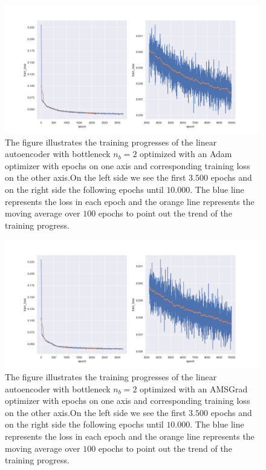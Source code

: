 \begin{figure}
\begin{center}
\includegraphics[width=\linewidth]{linear_AE_2d_adam_training_progress}
\end{center}
\caption{The figure illustrates the training progresses of the linear autoencoder with bottleneck $n_b=2$ optimized with an Adam optimizer with epochs on one axis and corresponding training loss on the other axis.On the left side we see the first $3.500$ epochs and on the right side the following epochs until $10.000$. The blue line represents the loss in each epoch and the orange line represents the moving average over $100$ epochs to point out the trend of the training progress.}\label{fig:linear_AE_2d_adam_training_progress}
\end{figure}


\begin{figure}
\begin{center}
\includegraphics[width=\linewidth]{linear_AE_2d_amsgrad_training_progress}
\end{center}
\caption{The figure illustrates the training progresses of the linear autoencoder with bottleneck $n_b=2$ optimized with an AMSGrad optimizer with epochs on one axis and corresponding training loss on the other axis.On the left side we see the first $3.500$ epochs and on the right side the following epochs until $10.000$. The blue line represents the loss in each epoch and the orange line represents the moving average over $100$ epochs to point out the trend of the training progress.}\label{fig:linear_AE_2d_amsgrad_training_progress}
\end{figure}


